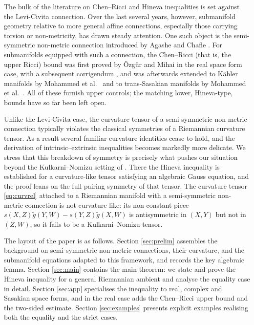\documentclass[11pt]{article}
\theoremstyle{definition}
\newcommand{\tg}{\widetilde{g}}
\begin{document}
The bulk of the literature on Chen--Ricci and Hineva inequalities is set against the Levi-Civita connection. Over the last several years, however, submanifold geometry relative to more general affine connections, especially those carrying torsion or non-metricity, has drawn steady attention. One such object is the semi-symmetric non-metric connection introduced by Agashe and Chafle \cite{AC1}. For submanifolds equipped with such a connection, the Chen--Ricci (that is, the upper Ricci) bound was first proved by \"Ozg\"ur and Mihai \cite{OM1} in the real space form case, with a subsequent corrigendum \cite{OM2}, and was afterwards extended to K\"ahler manifolds by Mohammed et al.\ \cite{Moh1} and to trans-Sasakian manifolds by Mohammed et al.\ \cite{Moh2}. All of these furnish upper controls; the matching lower, Hineva-type, bounds have so far been left open.

Unlike the Levi-Civita case, the curvature tensor of a semi-symmetric non-metric connection typically violates the classical symmetries of a Riemannian curvature tensor. As a result several familiar curvature identities cease to hold, and the derivation of intrinsic--extrinsic inequalities becomes markedly more delicate. We stress that this breakdown of symmetry is precisely what pushes our situation beyond the Kulkarni--Nomizu setting of \cite{Verma1}. There the Hineva inequality is established for a curvature-like tensor satisfying an algebraic Gauss equation, and the proof leans on the full pairing symmetry of that tensor. The curvature tensor \eqref{eq:curvrel} attached to a Riemannian manifold with a semi-symmetric non-metric connection is not curvature-like: its non-constant piece $s(X,Z)\tg(Y,W)-s(Y,Z)\tg(X,W)$ is antisymmetric in $(X,Y)$ but not in $(Z,W)$, so it fails to be a Kulkarni--Nomizu tensor. 


The layout of the paper is as follows. Section \ref{sec:prelim} assembles the background on semi-symmetric non-metric connections, their curvature, and the submanifold equations adapted to this framework, and records the key algebraic lemma. Section \ref{sec:main} contains the main theorem: we state and prove the Hineva inequality for a general Riemannian ambient and analyse the equality case in detail. Section \ref{sec:app} specialises the inequality to real, complex and Sasakian space forms, and in the real case adds the Chen--Ricci upper bound and the two-sided estimate. Section \ref{sec:examples} presents explicit examples realising both the equality and the strict cases.
\end{document}
